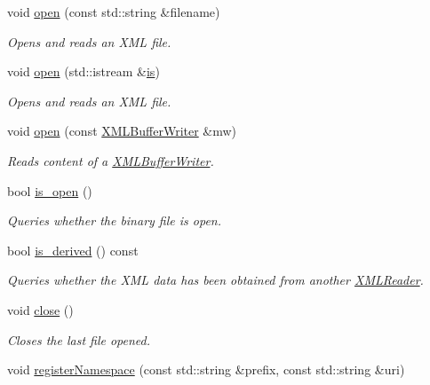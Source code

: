 \begin{DoxyCompactItemize}
void \mbox{\hyperlink{classADATXML_1_1XMLReader_ad5dcbd08800bc67ac4a91f93cb1504b0}{open}} (const std\+::string \&filename)
\begin{DoxyCompactList}\small\item\em Opens and reads an X\+ML file. \end{DoxyCompactList}\item 
void \mbox{\hyperlink{classADATXML_1_1XMLReader_a7938cc7e08b0381e467eb7b916cbbd97}{open}} (std\+::istream \&\mbox{\hyperlink{x_8cc_a81abbbdef81e25584a2eab888e643d3d}{is}})
\begin{DoxyCompactList}\small\item\em Opens and reads an X\+ML file. \end{DoxyCompactList}\item 
void \mbox{\hyperlink{classADATXML_1_1XMLReader_a38615b0ae22722bd15a47e27953dc77c}{open}} (const \mbox{\hyperlink{classADATXML_1_1XMLBufferWriter}{X\+M\+L\+Buffer\+Writer}} \&mw)
\begin{DoxyCompactList}\small\item\em Reads content of a \mbox{\hyperlink{classADATXML_1_1XMLBufferWriter}{X\+M\+L\+Buffer\+Writer}}. \end{DoxyCompactList}\item 
bool \mbox{\hyperlink{classADATXML_1_1XMLReader_ae9e467fca3d4bf34351dc00e9797a06f}{is\+\_\+open}} ()
\begin{DoxyCompactList}\small\item\em Queries whether the binary file is open. \end{DoxyCompactList}\item 
bool \mbox{\hyperlink{classADATXML_1_1XMLReader_a64fb149ae8809f993a7750aa5fe1f4b7}{is\+\_\+derived}} () const
\begin{DoxyCompactList}\small\item\em Queries whether the X\+ML data has been obtained from another \mbox{\hyperlink{classADATXML_1_1XMLReader}{X\+M\+L\+Reader}}. \end{DoxyCompactList}\item 
void \mbox{\hyperlink{classADATXML_1_1XMLReader_a0e5f84d85bb03e1ba3c01a20b1642a36}{close}} ()
\begin{DoxyCompactList}\small\item\em Closes the last file opened. \end{DoxyCompactList}\item 
void \mbox{\hyperlink{classADATXML_1_1XMLReader_aeb735523fc1858850ae8a2be61a34189}{register\+Namespace}} (const std\+::string \&prefix, const std\+::string \&uri)

\end{DoxyCompactItemize}
